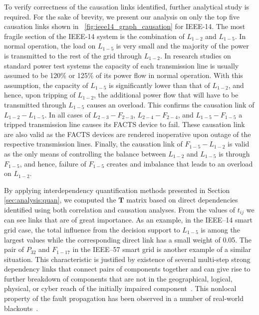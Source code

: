\documentclass[12pt]{elsarticle}
\begin{document}
To verify correctness of the causation links identified, further analytical study is required. For the sake of brevity, we present our analysis on only the top five causation links shown in \figurename~\ref{fig:ieee14_graph_causation} for IEEE-14. The most fragile section of the IEEE-14 system is the combination of $L_{1-2}$ and $L_{1-5}$. In normal operation, the load on $L_{1-5}$ is very small and the majority of the power is transmitted to the rest of the grid through $L_{1-2}$. In research studies on standard power test systems the capacity of each transmission line is usually assumed to be 120\% or 125\% of its power flow in normal operation. With this assumption, the capacity of $L_{1-5}$ is significantly lower than that of $L_{1-2}$, and hence, upon tripping of $L_{1-2}$, the additional power flow that will have to be transmitted through $L_{1-5}$ causes an overload. This confirms the causation link of $L_{1-2} - L_{1-5}$. In all cases of $L_{2-3} - F_{2-3}$, $L_{2-4} - F_{2-4}$, and $L_{1-5} - F_{1-5}$ a tripped transmission line causes its FACTS device to fail. These causation link are also valid as the FACTS devices are rendered inoperative upon outage of the respective transmission lines. Finally, the causation link of $F_{1-5} - L_{1-2}$ is valid as the only means of controlling the balance between $L_{1-2}$ and $L_{1-5}$ is through $F_{1-5}$, and hence, failure of $F_{1-5}$ creates and imbalance that leads to an overload on $L_{1-2}$.

By applying interdependency quantification methods presented in Section \ref{sec:analysis:quan}, we computed the $\mathbf{T}$ matrix based on  direct dependencies identified using both correlation and causation analyses. From the values of $t_{ij}$ we can see links that are of great importance. As an example, in the IEEE--14 smart grid case, the total influence from the decision support to $L_{1-5}$ is among the largest values while the corresponding direct link has a small weight of 0.05. The pair of $P_{32}$ and $F_{1-17}$ in the IEEE--57 smart grid is another example of a similar situation. This characteristic is justified by existence of several multi-step strong dependency links that connect pairs of components together and can give rise to further breakdown of components that are not in the geographical, logical, physical, or cyber reach of the initially impaired component~\cite{RiP01}. This nonlocal property of the fault propagation has been observed in a number of real-world blackouts~\cite{BeA04,A14Rp}.
\end{document}
